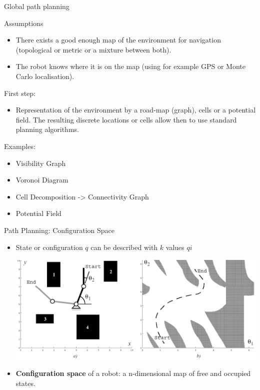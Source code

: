 \documentclass[compress]{beamer}
\begin{document}
\begin{frame}{Global path planning}

Assumptions

\begin{itemize}
\item There exists a good enough map of the environment for navigation
  (topological or metric or a mixture between both).
\item The robot knows where it is on the map (using for example GPS or Monte
  Carlo localisation).
\end{itemize}

First step:

\begin{itemize}
\item Representation of the environment by a road-map (graph), cells or a
  potential field. The resulting discrete locations or cells allow then
  to use standard planning algorithms.
\end{itemize}

Examples:

\begin{itemize}
\item Visibility Graph
\item Voronoi Diagram
\item Cell Decomposition -\textgreater{} Connectivity Graph
\item Potential Field
\end{itemize}

\end{frame}

\begin{frame}{Path Planning: Configuration Space}

\begin{itemize}
\item State or configuration $q$ can be described with $k$ values
  $qi$

    \begin{center}
        \includegraphics[width=0.6\linewidth]{configurationspace}
    \end{center}

\item \textbf{Configuration space} of a robot: a n-dimensional map of free
  and occupied states.
\end{itemize}

\end{frame}
\end{document}
